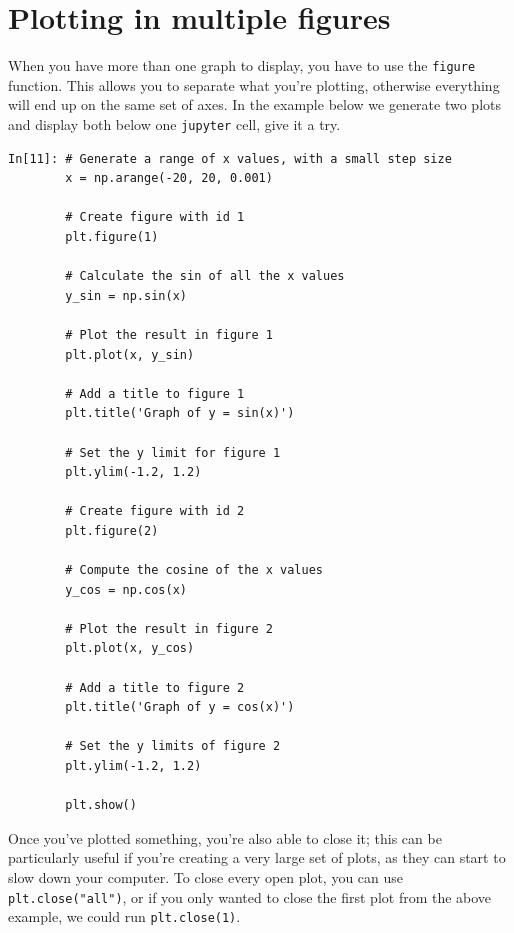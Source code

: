\section{Plotting in multiple figures}
When you have more than one graph to display, you have to use the \texttt{figure} function. This allows you to separate what you're plotting, otherwise everything will end up on the same set of axes. In the example below we generate two plots and display both below one \texttt{jupyter} cell, give it a try.
\begin{lstlisting}[style=PY]
In[11]: # Generate a range of x values, with a small step size
        x = np.arange(-20, 20, 0.001)  
        
        # Create figure with id 1
        plt.figure(1)
        
        # Calculate the sin of all the x values
        y_sin = np.sin(x)
        
        # Plot the result in figure 1
        plt.plot(x, y_sin)
        
        # Add a title to figure 1
        plt.title('Graph of y = sin(x)')
        
        # Set the y limit for figure 1
        plt.ylim(-1.2, 1.2)
        
        # Create figure with id 2
        plt.figure(2)
        
        # Compute the cosine of the x values
        y_cos = np.cos(x)
        
        # Plot the result in figure 2
        plt.plot(x, y_cos)
        
        # Add a title to figure 2
        plt.title('Graph of y = cos(x)')
        
        # Set the y limits of figure 2
        plt.ylim(-1.2, 1.2)
        
        plt.show()
\end{lstlisting}

\noindent Once you've plotted something, you're also able to close it; this can be particularly useful if you're creating a very large set of plots, as they can start to slow down your computer. To close every open plot, you can use \texttt{plt.close("all")}, or if you only wanted to close the first plot from the above example, we could run \texttt{plt.close(1)}.


